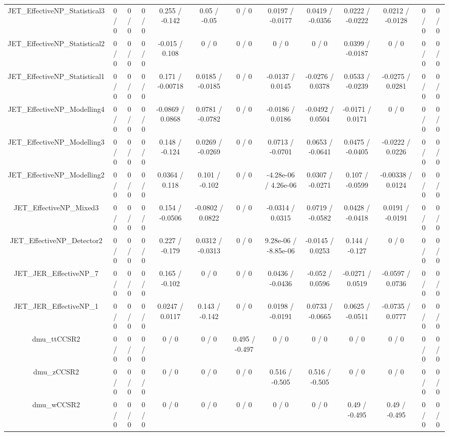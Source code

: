 \documentclass[10pt]{article}
\begin{document}
\begin{table}[htbp]
\begin{center}
\begin{tabular}{|c|c|c|c|c|c|c|c|c|c|c|c|c|}
  JET_EffectiveNP_Statistical3 & 0 / 0 & 0 / 0 & 0 / 0 & 0.255 / -0.142 & 0.05 / -0.05 & 0 / 0 & 0.0197 / -0.0177 & 0.0419 / -0.0356 & 0.0222 / -0.0222 & 0.0212 / -0.0128 & 0 / 0 & 0 / 0 \\ 
  JET_EffectiveNP_Statistical2 & 0 / 0 & 0 / 0 & 0 / 0 & -0.015 / 0.108 & 0 / 0 & 0 / 0 & 0 / 0 & 0 / 0 & 0.0399 / -0.0187 & 0 / 0 & 0 / 0 & 0 / 0 \\ 
  JET_EffectiveNP_Statistical1 & 0 / 0 & 0 / 0 & 0 / 0 & 0.171 / -0.00718 & 0.0185 / -0.0185 & 0 / 0 & -0.0137 / 0.0145 & -0.0276 / 0.0378 & 0.0533 / -0.0239 & -0.0275 / 0.0281 & 0 / 0 & 0 / 0 \\ 
  JET_EffectiveNP_Modelling4 & 0 / 0 & 0 / 0 & 0 / 0 & -0.0869 / 0.0868 & 0.0781 / -0.0782 & 0 / 0 & -0.0186 / 0.0186 & -0.0492 / 0.0504 & -0.0171 / 0.0171 & 0 / 0 & 0 / 0 & 0 / 0 \\ 
  JET_EffectiveNP_Modelling3 & 0 / 0 & 0 / 0 & 0 / 0 & 0.148 / -0.124 & 0.0269 / -0.0269 & 0 / 0 & 0.0713 / -0.0701 & 0.0653 / -0.0641 & 0.0475 / -0.0405 & -0.0222 / 0.0226 & 0 / 0 & 0 / 0 \\ 
  JET_EffectiveNP_Modelling2 & 0 / 0 & 0 / 0 & 0 / 0 & 0.0364 / 0.118 & 0.101 / -0.102 & 0 / 0 & -4.28e-06 / 4.26e-06 & 0.0307 / -0.0271 & 0.107 / -0.0599 & -0.00338 / 0.0124 & 0 / 0 & 0 / 0 \\ 
  JET_EffectiveNP_Mixed3 & 0 / 0 & 0 / 0 & 0 / 0 & 0.154 / -0.0506 & -0.0802 / 0.0822 & 0 / 0 & -0.0314 / 0.0315 & 0.0719 / -0.0582 & 0.0428 / -0.0418 & 0.0191 / -0.0191 & 0 / 0 & 0 / 0 \\ 
  JET_EffectiveNP_Detector2 & 0 / 0 & 0 / 0 & 0 / 0 & 0.227 / -0.179 & 0.0312 / -0.0313 & 0 / 0 & 9.28e-06 / -8.85e-06 & -0.0145 / 0.0253 & 0.144 / -0.127 & 0 / 0 & 0 / 0 & 0 / 0 \\ 
  JET_JER_EffectiveNP_7 & 0 / 0 & 0 / 0 & 0 / 0 & 0.165 / -0.102 & 0 / 0 & 0 / 0 & 0.0436 / -0.0436 & -0.052 / 0.0596 & -0.0271 / 0.0519 & -0.0597 / 0.0736 & 0 / 0 & 0 / 0 \\ 
  JET_JER_EffectiveNP_1 & 0 / 0 & 0 / 0 & 0 / 0 & 0.0247 / 0.0117 & 0.143 / -0.142 & 0 / 0 & 0.0198 / -0.0191 & 0.0733 / -0.0665 & 0.0625 / -0.0511 & -0.0735 / 0.0777 & 0 / 0 & 0 / 0 \\ 
  dmu_ttCCSR2 & 0 / 0 & 0 / 0 & 0 / 0 & 0 / 0 & 0 / 0 & 0.495 / -0.497 & 0 / 0 & 0 / 0 & 0 / 0 & 0 / 0 & 0 / 0 & 0 / 0 \\ 
  dmu_zCCSR2 & 0 / 0 & 0 / 0 & 0 / 0 & 0 / 0 & 0 / 0 & 0 / 0 & 0.516 / -0.505 & 0.516 / -0.505 & 0 / 0 & 0 / 0 & 0 / 0 & 0 / 0 \\ 
  dmu_wCCSR2 & 0 / 0 & 0 / 0 & 0 / 0 & 0 / 0 & 0 / 0 & 0 / 0 & 0 / 0 & 0 / 0 & 0.49 / -0.495 & 0.49 / -0.495 & 0 / 0 & 0 / 0 \\ 

\end{tabular}
\end{center}
\end{table}
\end{document}
